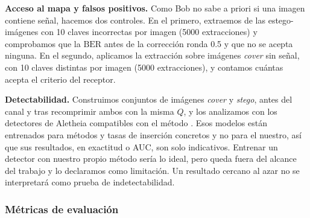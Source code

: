 \documentclass[IB]{TFUOC}%
\begin{document}
\textbf{Acceso al mapa y falsos positivos.} Como Bob no sabe a priori si una imagen contiene señal, hacemos dos controles. En el primero, extraemos de las estego-imágenes con 10 claves incorrectas por imagen (5000 extracciones) y comprobamos que la $\mathrm{BER}$ antes de la corrección ronda 0.5 y que no se acepta ninguna. En el segundo, aplicamos la extracción sobre imágenes \textit{cover} sin señal, con 10 claves distintas por imagen (5000 extracciones), y contamos cuántas acepta el criterio del receptor.

\textbf{Detectabilidad.} Construimos conjuntos de imágenes \textit{cover} y \textit{stego}, antes del canal y tras recomprimir ambos con la misma $Q$, y los analizamos con los detectores de Aletheia compatibles con el método \cite{1}. Esos modelos están entrenados para métodos y tasas de inserción concretos y no para el nuestro, así que sus resultados, en exactitud o AUC, son solo indicativos. Entrenar un detector con nuestro propio método sería lo ideal, pero queda fuera del alcance del trabajo y lo declaramos como limitación. Un resultado cercano al azar no se interpretará como prueba de indetectabilidad.

\subsubsection{Métricas de evaluación}
\end{document}

